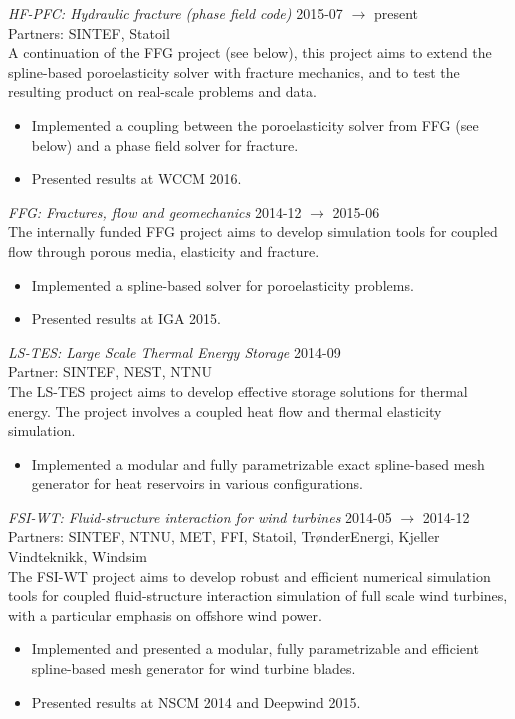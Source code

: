 \documentclass[line,margin]{res}
\begin{document}
\begin{resume}
{\em HF-PFC: Hydraulic fracture (phase field code)}
\hfill 2015-07 $\to$ present \\
{\small Partners: SINTEF, Statoil} \\
A continuation of the FFG project (see below), this project aims to extend the
spline-based poroelasticity solver with fracture mechanics, and to test the
resulting product on real-scale problems and data.
\begin{itemize}
\item Implemented a coupling between the poroelasticity solver from FFG (see
  below) and a phase field solver for fracture.
\item Presented results at  WCCM 2016.
\end{itemize}

{\em FFG: Fractures, flow and geomechanics} \hfill 2014-12 $\to$ 2015-06 \\
The internally funded FFG project aims to develop simulation tools for coupled
flow through porous media, elasticity and fracture.
\begin{itemize}
\item Implemented a spline-based solver for poroelasticity problems.
\item Presented results at  IGA 2015.
\end{itemize}

{\em LS-TES: Large Scale Thermal Energy Storage} \hfill 2014-09 \\
{\small Partner: SINTEF, NEST, NTNU} \\
The LS-TES project aims to develop effective storage solutions for thermal
energy. The project involves a coupled heat flow and thermal elasticity
simulation.
\begin{itemize}
\item Implemented a modular and fully parametrizable exact spline-based mesh
  generator for heat reservoirs in various configurations.
\end{itemize}

{\em FSI-WT: Fluid-structure interaction for wind turbines}
\hfill 2014-05 $\to$ 2014-12 \\
{\small Partners: SINTEF, NTNU, MET, FFI, Statoil, TrønderEnergi, Kjeller Vindteknikk, Windsim} \\
The FSI-WT project aims to develop robust and efficient numerical simulation
tools for coupled fluid-structure interaction simulation of full scale wind
turbines, with a particular emphasis on offshore wind power.
\begin{itemize}
\item Implemented and presented a modular, fully parametrizable and efficient
  spline-based mesh generator for wind turbine blades.
\item Presented results at  NSCM 2014 and  Deepwind 2015.
\end{itemize}



\end{resume}
\end{document}
